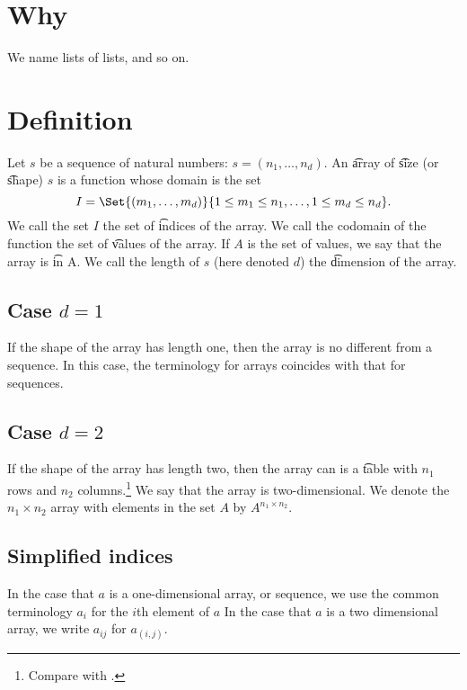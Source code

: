 
\section*{Why}

We name lists of lists, and so on.

\section*{Definition}

Let $s$ be a sequence of natural numbers: $s = (n_1, \dots , n_d)$.
An \t{array} of \t{size} (or \t{shape}) $s$ is a function whose domain is the set
\[
I = \Set{(m_1, \dots , m_d)}{ 1 \leq m_1 \leq n_1, \dots , 1 \leq m_d \leq n_d}.
\]
We call the set $I$ the set of \t{indices} of the array.
We call the codomain of the function the set of \t{values} of the array.
If $A$ is the set of values, we say that the array is \t{in} A.
We call the length of $s$ (here denoted $d$) the \t{dimension} of the array.

\subsection*{Case $d = 1$}

If the shape of the array has length one, then the array is no different from a sequence.
In this case, the terminology for arrays coincides with that for sequences.

\subsection*{Case $d = 2$}

If the shape of the array has length two, then the array can is a \t{table} with $n_1$ rows and $n_2$ columns.\footnote{Compare with .}
We say that the array is two-dimensional.
We denote the $n_1 \times  n_2$ array with elements in the set $A$ by $A^{n_1 \times  n_2}$.

\subsection*{Simplified indices}

In the case that $a$ is a one-dimensional array, or sequence, we use the common terminology $a_i$ for the $i$th element of $a$
In the case that $a$ is a two dimensional array, we write $a_{ij}$ for $a_{(i,j)}$.

